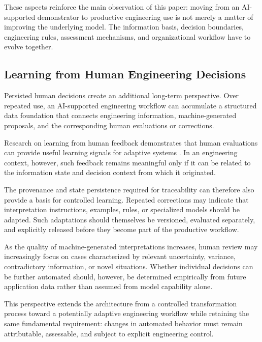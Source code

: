 These aspects reinforce the main observation of this paper: moving from an AI-supported
demonstrator to productive engineering use is not merely a matter of improving the
underlying model. The information basis, decision boundaries, engineering rules,
assessment mechanisms, and organizational workflow have to evolve together.

\subsection{Learning from Human Engineering Decisions}
\label{sec:discussion_learning}

Persisted human decisions create an additional long-term perspective. Over repeated use,
an AI-supported engineering workflow can accumulate a structured data foundation that connects
engineering information, machine-generated proposals, and the corresponding human
evaluations or corrections.

Research on learning from human feedback demonstrates that human evaluations can provide
useful learning signals for adaptive systems \cite{Christiano2017,Ouyang2022}. In an
engineering context, however, such feedback remains meaningful only if it can be related to
the information state and decision context from which it originated.

The provenance and state persistence required for traceability can therefore also provide
a basis for controlled learning. Repeated corrections may indicate that interpretation
instructions, examples, rules, or specialized models should be adapted. Such adaptations
should themselves be versioned, evaluated separately, and explicitly released before they
become part of the productive workflow.

As the quality of machine-generated interpretations increases, human review may
increasingly focus on cases characterized by relevant uncertainty, variance, contradictory
information, or novel situations. Whether individual decisions can be further
automated should, however, be determined empirically from future application data rather
than assumed from model capability alone.

This perspective extends the architecture from a controlled transformation process toward
a potentially adaptive engineering workflow while retaining the same fundamental
requirement: changes in automated behavior must remain attributable, assessable, and
subject to explicit engineering control.
